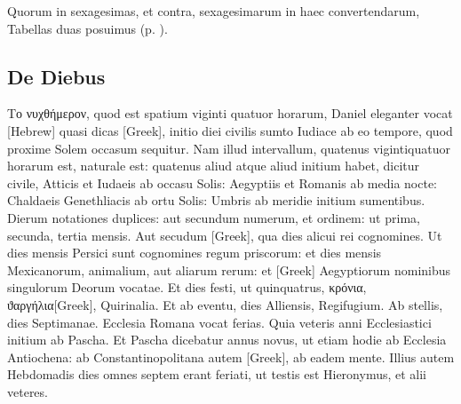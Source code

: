 Quorum in sexagesimas, et
contra, sexagesimarum in haec convertendarum, Tabellas duas posuimus
 (p. \pageref{tab:convertendi_ostenta}).


\subsection{De Diebus}

\textgreek{Το νυχθήμερον},
quod est spatium viginti quatuor horarum, Daniel
eleganter vocat \texthebrew{[Hebrew]} quasi dicas
 \textgreek{[Greek]}, initio diei civilis
sumto Iudiace ab eo tempore, quod proxime Solem occasum
sequitur.
Nam illud intervallum, quatenus vigintiquatuor horarum est,
naturale est: quatenus aliud atque aliud initium habet, dicitur civile,
Atticis et Iudaeis ab occasu Solis: Aegyptiis et Romanis ab media nocte:
Chaldaeis Genethliacis ab ortu Solis: Umbris ab meridie initium
sumentibus.
Dierum notationes duplices: aut secundum numerum, et
ordinem: ut prima, secunda, tertia mensis.
Aut secudum \textgreek{[Greek]},
qua dies alicui rei cognomines.
Ut dies mensis Persici sunt cognomines
regum priscorum: et dies mensis Mexicanorum, animalium, aut aliarum
rerum: et \textgreek{[Greek]} Aegyptiorum nominibus singulorum Deorum
vocatae.
Et dies festi, ut quinquatrus, \textgreek{κρόνια},
\textgreek{ϑαργήλια[Greek]}, Quirinalia.
Et ab eventu, dies Alliensis, Regifugium.
Ab stellis, dies Septimanae.
Ecclesia Romana vocat ferias.
Quia veteris anni Ecclesiastici initium
ab Pascha.
Et Pascha dicebatur annus novus, ut etiam hodie ab Ecclesia
Antiochena: ab Constantinopolitana autem \textgreek{[Greek]},
ab eadem mente.
Illius autem Hebdomadis dies omnes septem erant
feriati, ut testis est Hieronymus, et alii veteres.
